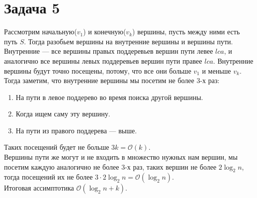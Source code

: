 \documentclass{article}
\begin{document}
\section{Задача 5}
Рассмотрим начальную($v_1$) и конечную($v_k$) вершины, пусть между ними есть путь $S$. Тогда разобьем вершины на внутренние вершины и вершины пути. Внутренние --- все вершины правых поддеревьев вершин пути левее $lca$, и аналогично все вершины левых поддеревьев вершин пути правее $lca$. Внутренние вершины будут точно посещены, потому, что все они больше $v_1$ и меньше $v_k$. Тогда заметим, что внутренние вершины мы посетим не более $3$-х раз:
\begin{enumerate}
\item На пути в левое поддерево во время поиска другой вершины.
\item Когда ищем саму эту вершину.
\item На пути из правого поддерева --- выше.
\end{enumerate}
Таких посещений будет не больше $3k = \mathcal{O}(k)$.\\
Вершины пути же могут и не входить в множество нужных нам вершин, мы посетим каждую аналогично не более $3$-х раз, таких вершин не более $2\log_2{n}$, тогда посещений их не более $3\cdot 2\log_2{n} = \mathcal{O}(\log_2{n})$.\\
Итоговая ассимптотика $\mathcal{O}(\log_2{n}+k)$.
\end{document}
